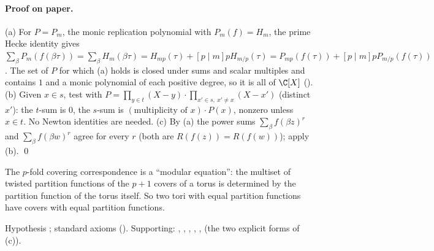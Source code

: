 \paragraph{Proof on paper.}  (a) For $P=P_m$, the monic replication polynomial with $P_m(f)=H_m$, the prime Hecke identity
gives $\sum_\beta P_m(f(\beta\tau))=\sum_\beta H_m(\beta\tau)=H_{mp}(\tau)+[p\mid m]pH_{m/p}(\tau)=P_{mp}(f(\tau))+[p\mid m]pP_{m/p}(f(\tau))$.  The
set of $P$ for which (a) holds is closed under sums and scalar multiples and contains $1$ and a monic polynomial of each
positive degree, so it is all of $\C[X]$ ().  (b) Given $x\in s$, test with
$P=\prod_{y\in t}(X-y)\cdot\prod_{x'\in s,\ x'\ne x}(X-x')$ (distinct $x'$): the $t$-sum is $0$, the $s$-sum is
$(\text{multiplicity of }x)\cdot P(x)$, nonzero unless $x\in t$.  No Newton identities are needed.  (c) By (a) the power sums
$\sum_\beta f(\beta z)^r$ and $\sum_\beta f(\beta w)^r$ agree for every $r$ (both are $R(f(z))=R(f(w))$); apply (b). \qed
\begin{physics}The $p$-fold covering correspondence is a ``modular equation'': the multiset of twisted partition functions of
the $p+1$ covers of a torus is determined by the partition function of the torus itself.  So two tori with equal partition
functions have covers with equal partition functions.\end{physics}
\begin{status}Hypothesis ; standard axioms ().
Supporting: , , ,
, ,  (the two explicit forms of (c)).\end{status}

